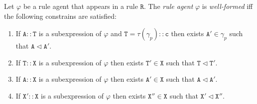 \documentclass{entcs}
\renewcommand{\~}[0]{\texttildelow}
\begin{document}
\begin{definition}
Let $\varphi$ be a rule agent that appears in a rule $\mathtt{R}$. The \emph{rule agent} $\varphi$ is \emph{well-formed} iff the following constrains are satisfied:

\begin{enumerate}
 \item If $\mathtt{A}::\mathtt{T}$ is a subexpression of $\varphi$ and $\mathtt{T} = \tau(\gamma_p)::\mathtt{c}$ then exists $\mathtt{A}' \in \gamma_p$ such that $\mathtt{A} \lhd \mathtt{A}'$.

\item If $\mathtt{T}::\mathtt{X}$ is a subexpression of $\varphi$ then exists $\mathtt{T}' \in \mathtt{X}$ such that $\mathtt{T} \lhd \mathtt{T}'$.

\item If $\mathtt{A}::\mathtt{X}$ is a subexpression of $\varphi$ then exists $\mathtt{A}' \in \mathtt{X}$ such that $\mathtt{A} \lhd \mathtt{A}'$.

\item If $\mathtt{X}'::\mathtt{X}$ is a subexpression of $\varphi$ then exists $\mathtt{X}'' \in \mathtt{X}$ such that $\mathtt{X}' \lhd \mathtt{X}''$.

\end{enumerate}

\end{definition}
\end{document}
